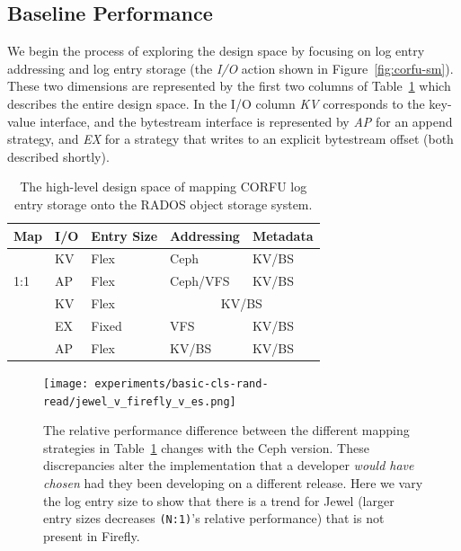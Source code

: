 \documentclass[10pt,twocolumn]{article}
\begin{document}
\subsection{Baseline Performance}

We begin the process of exploring the design space by focusing on log entry
addressing and log entry storage (the \emph{I/O} action shown in
Figure~\ref{fig:corfu-sm}).  These two dimensions are represented by the first
two columns of Table~\ref{tab:pd-map} which describes the entire design space.
In the I/O column \emph{KV} corresponds to the key-value interface, and the
bytestream interface is represented by \emph{AP} for an append strategy, and
\emph{EX} for a strategy that writes to an explicit bytestream offset (both
described shortly).

\begin{table}[h]
\begin{tabular}{ | l | l | l | l | l |}
\hline
Map & I/O & Entry Size & Addressing & Metadata \\ \hline
\multirow{3}{*}{1:1} & KV  & Flex     & Ceph      & KV/BS \\ \cline{2-5}
                     & AP  & Flex     & Ceph/VFS  & KV/BS \\ \hline
\multirow{4}{*}{N:1} & KV  & Flex     & \multicolumn{2}{|c|}{KV/BS} \\ \cline{2-5}
                     & EX  & Fixed    & VFS       & KV/BS \\ \cline{2-5}
                     & AP  & Flex     & KV/BS     & KV/BS \\
\hline
\end{tabular}
\caption{The high-level design space of mapping CORFU log entry storage onto
the RADOS object storage system. }
\label{tab:pd-map}
\end{table}

\begin{figure}[t]
	\centering
	\texttt{[image: experiments/basic-cls-rand-read/jewel\_v\_firefly\_v\_es.png]}
	\caption{The relative performance difference between the different mapping strategies in Table~\ref{tab:pd-map} changes with the Ceph version. These discrepancies alter the implementation that a developer \emph{would have chosen} had they been developing on a different release. Here we vary the log entry size to show that there is a trend for Jewel (larger entry sizes decreases \texttt{(N:1)}'s relative performance) that is not present in Firefly.
	\label{fig:jewel_v_firefly_v_es}}
\end{figure}
\end{document}
